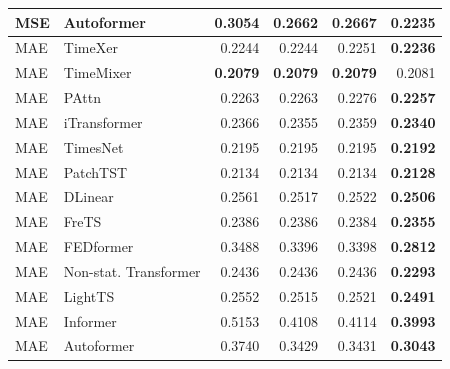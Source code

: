 \begin{longtable}{llrrrr}
MSE & Autoformer & 0.3054 & 0.2662 & 0.2667 & \textbf{0.2235} \\
\midrule
MAE & TimeXer & 0.2244 & 0.2244 & 0.2251 & \textbf{0.2236} \\
MAE & TimeMixer & \textbf{0.2079} & \textbf{0.2079} & \textbf{0.2079} & 0.2081 \\
MAE & PAttn & 0.2263 & 0.2263 & 0.2276 & \textbf{0.2257} \\
MAE & iTransformer & 0.2366 & 0.2355 & 0.2359 & \textbf{0.2340} \\
MAE & TimesNet & 0.2195 & 0.2195 & 0.2195 & \textbf{0.2192} \\
MAE & PatchTST & 0.2134 & 0.2134 & 0.2134 & \textbf{0.2128} \\
MAE & DLinear & 0.2561 & 0.2517 & 0.2522 & \textbf{0.2506} \\
MAE & FreTS & 0.2386 & 0.2386 & 0.2384 & \textbf{0.2355} \\
MAE & FEDformer & 0.3488 & 0.3396 & 0.3398 & \textbf{0.2812} \\
MAE & Non-stat. Transformer & 0.2436 & 0.2436 & 0.2436 & \textbf{0.2293} \\
MAE & LightTS & 0.2552 & 0.2515 & 0.2521 & \textbf{0.2491} \\
MAE & Informer & 0.5153 & 0.4108 & 0.4114 & \textbf{0.3993} \\
MAE & Autoformer & 0.3740 & 0.3429 & 0.3431 & \textbf{0.3043} \\
\end{longtable}
\endgroup


